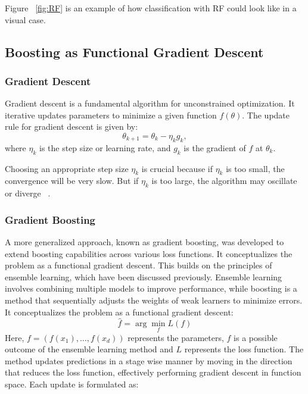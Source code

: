 Figure ~\ref{fig:RF} is an example of how classification with RF could look like in a visual case.

\subsection{Boosting as Functional Gradient Descent}

\subsubsection*{Gradient Descent}
Gradient descent is a fundamental algorithm for unconstrained optimization. It iterative updates parameters to minimize a given function \( f(\theta) \). The update rule for gradient descent is given by:
\begin{equation}
    \theta_{k+1} = \theta_k - \eta_k g_k,
\end{equation}
where \( \eta_k \) is the step size or learning rate, and \( g_k \) is the gradient of \( f \) at \( \theta_k \).

Choosing an appropriate step size \( \eta_k \) is crucial because if \( \eta_k \) is too small, the convergence will be very slow.
But if \( \eta_k \) is too large, the algorithm may oscillate or diverge ~\cite{murphy2013machine}.

\subsubsection*{Gradient Boosting}
A more generalized approach, known as gradient boosting, was developed to extend boosting capabilities across various loss functions. It conceptualizes the problem as a functional gradient descent. This builds on the principles of ensemble learning, which have been discussed previously. Ensemble learning involves combining multiple models to improve performance, while boosting is a method that sequentially adjusts the weights of weak learners to minimize errors. It conceptualizes the problem as a functional gradient descent:
\begin{equation}
\hat{f} = \arg\min_{f} L(f)
\end{equation}
Here, $f = (f(x_1), \dots, f(x_d))$ represents the parameters, $f$ is a possible outcome of the ensemble learning method and $L$ represents the loss function. The method updates predictions in a stage wise manner by moving in the direction that reduces the loss function, effectively performing gradient descent in function space. Each update is formulated as:


